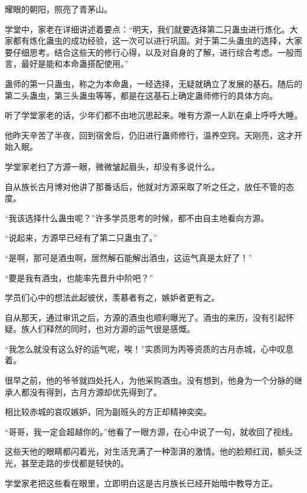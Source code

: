 
\begin{this_body}



耀眼的朝阳，照亮了青茅山。

学堂中，家老在详细讲述着要点：“明天，我们就要选择第二只蛊虫进行炼化。大家都有炼化蛊虫的成功经验，这一次可以进行巩固。对于第二头蛊虫的选择，大家要仔细思考。结合这些天的修行心得，以及对自身的了解，进行综合考虑。一般而言，最好是能和本命蛊搭配使用。”

蛊师的第一只蛊虫，称之为本命蛊，一经选择，无疑就确立了发展的基石。随后的第二头蛊虫，第三头蛊虫等等，都是在这基石上确定蛊师修行的具体方向。

听了学堂家老的话，少年们都不由地沉思起来。唯有方源一人趴在桌上呼呼大睡。

他昨天辛苦了半夜，回到宿舍后，仍旧进行蛊师修行，温养空窍。天刚亮，这才开始入眠。

学堂家老扫了方源一眼，微微皱起眉头，却没有多说什么。

自从族长古月博对他讲了那番话后，他就对方源采取了听之任之，放任不管的态度。

“我该选择什么蛊虫呢？”许多学员思考的时候，都不由自主地看向方源。

“说起来，方源早已经有了第二只蛊虫了。”

“是啊，那可是酒虫啊，居然解石能解出酒虫，这运气真是太好了！”

“要是我有酒虫，也能率先晋升中阶吧？”

学员们心中的想法此起彼伏，羡慕者有之，嫉妒者更有之。

自从那天，通过审讯之后，方源的酒虫也顺利曝光了。酒虫的来历，没有引起怀疑。族人们释然的同时，也对方源的运气很是感慨。

“我怎么就没有这么好的运气呢，唉！”实质同为丙等资质的古月赤城，心中叹息着。

很早之前，他的爷爷就四处托人，为他采购酒虫。没有想到，他身为一个分脉的继承人都没有得到，古月方源却优先得到了。

相比较赤城的哀叹嫉妒，同为副班头的方正却精神奕奕。

“哥哥，我一定会超越你的。”他看了一眼方源，在心中说了一句，就收回了视线。

这些天他的眼睛都闪着光，对生活充满了一种澎湃的激情。他的脸颊红润，额头泛光，甚至走路的步伐都是轻快的。

学堂家老把这些看在眼里，立即明白这是古月族长已经开始暗中教导方正。


\end{this_body}
